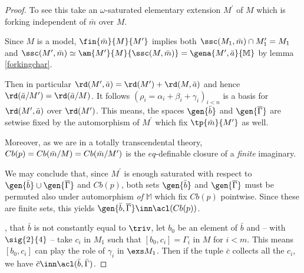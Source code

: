 \begin{proof}
To see this take an $\omega$-saturated elementary extension $M^{\prime}$ %
of $M$ which is forking independent of $\bar m$ over $M$.

Since $M$ is a model, $\fin{\bar m}{M}{M^{\prime}}$ implies both $\ssc(M_{1},\bar m)\cap M^{\prime}_{1}=M_{1}$
and $\ssc(M^{\prime},\bar m)\simeq\am{M^{\prime}}{M}{\ssc(M,\bar m)}=\gena{M^{\prime},\bar a}{\mathbb{M}}$
by lemma \ref{forkingchar}.

Then in particular $\rd(M^{\prime},\bar a)=\rd(M^{\prime})+\rd(M,\bar a)$
and hence %
$\rd(\bar a/M^{\prime})=\rd(\bar a/M)$. It follows $(\rho_{i}=\alpha_{i}+\beta_{i}+\gamma_{i})_{i<n}$ is
a basis for $\rd(M^{\prime},\bar a)$ over $\rd(M^{\prime})$.
This means, the spaces $\gen{\bar b}$ and $\gen{\overline{\Gamma}}$
are setwise fixed by the automorphism of
$M^{\prime}$ which fix $\tp{\bar m}{M^{\prime}}$ as well.

Moreover, as we are in a totally transcendental theory, $Cb(p)=Cb(\bar m/M)\\
=Cb(\bar m/M^{\prime})$ is
the $eq$-definable closure of a {\em finite} imaginary.

We may conclude that, since $M^{\prime}$ is enough saturated with respect to $\gen{\bar b}\cup\gen{\overline{\Gamma}}$ and $Cb(p)$,
both sets $\gen{\bar b}$ and $\gen{\overline{\Gamma}}$ must be permuted also under automorphism {\em of} $\mathbb{M}$ which
fix $Cb(p)$ pointwise. Since these are finite sets, this yields $\gen{\bar b, %
\overline{\Gamma}}\inn\acl(Cb(p))$.





\medskip

,
that $\bar b$ is not constantly equal to $\triv$,
let $b_{0}$ be an element of $\bar b$ and -- with $\sig{2}{4}$ -- take $c_{i}$ in $M_{1}$ such that
$[b_{0},c_{i}]=\Gamma_{i}$ in $M$ for $i<m$. This means $[b_{0},c_{i}]$ can play the role of $\gamma_{i}$ in $\exs M_{1}$.
Then if the tuple $\bar c$ collects all the $c_{i}$, %
we have $\bar c\inn\acl(\bar b,\bar\Gamma)$. %


\end{proof}
